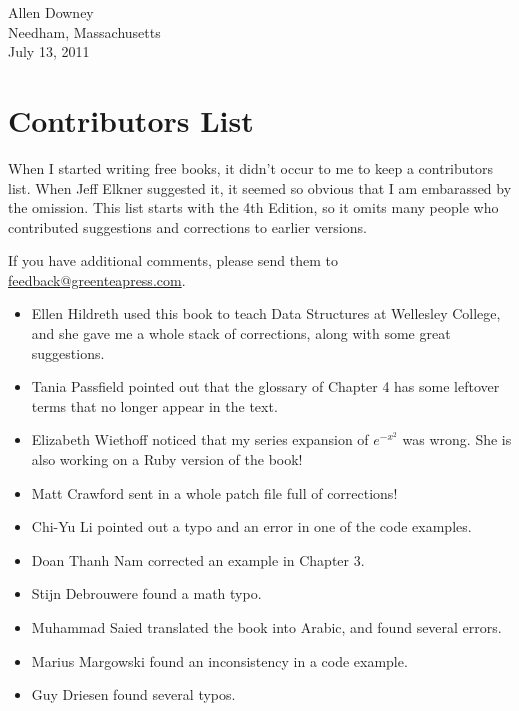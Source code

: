 \documentclass[12pt]{book}
\theoremstyle{definition}
\begin{document}
\vspace{0.2in}

\begin{flushleft}
Allen Downey\\
Needham, Massachusetts\\
July 13, 2011
\end{flushleft}


\section*{Contributors List}

When I started writing free books, it didn't occur to me to keep
a contributors list.  When Jeff Elkner suggested it, it seemed so
obvious that I am embarassed by the omission.  This list starts
with the 4th Edition, so it omits many people who contributed
suggestions and corrections to earlier versions.

If you have additional comments, please send them to
\url{feedback@greenteapress.com}.

\begin{itemize}

\item Ellen Hildreth used this book to teach Data Structures at
Wellesley College, and she gave me a whole stack of corrections,
along with some great suggestions.

\item Tania Passfield pointed out that the glossary of Chapter 4
has some leftover terms that no longer appear in the text.

\item Elizabeth Wiethoff noticed that my series expansion of
$e^{-x^2}$ was wrong.  She is also working on a Ruby version of
the book!

\item Matt Crawford sent in a whole patch file full of corrections!

\item Chi-Yu Li pointed out a typo and an error in one of the code
examples.

\item Doan Thanh Nam corrected an example in Chapter 3.

\item Stijn Debrouwere found a math typo.

\item Muhammad Saied translated the book into Arabic, and found
several errors.

\item Marius Margowski found an inconsistency in a code example.

\item Guy Driesen found several typos.

\end{itemize}
\end{document}

